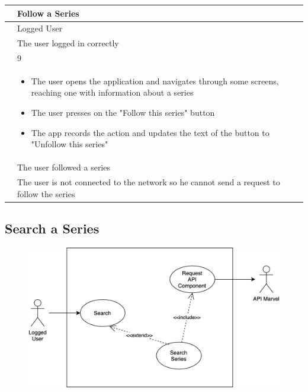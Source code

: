 {{{{{{{\renewcommand{\arraystretch}{2}
{\begin{center}
\begin{tabular}{ | m{4cm} | m{9cm} | } 
 \hline
 {\centering{\textbf{Name}}} & Follow a Series \\
 \hline
 {\centering{\textbf{Actor}}} & Logged User \\
 \hline
 {\centering{\textbf{Entry Condition}}} & The user logged in correctly \\
 \hline
 {\centering{\textbf{Goal}}} & 9 \\
 \hline
 {\centering{\textbf{Event flow}}} & \begin{itemize}[leftmargin=*]
 	\item The user opens the application and navigates through some screens, reaching one with information about a series
	\item The user presses on the "Follow this series" button 
	\item The app records the action and updates the text of the button to "Unfollow this series"
	\end{itemize} \\	
 \hline
 {\centering{\textbf{Exit condition}}} & The user followed a series \\
 \hline
 {\centering{\textbf{Exceptions}}} & The user is not connected to the network so he cannot send a request to follow the series \\
 \hline
\end{tabular}
\end{center}}


\clearpage

\subsection{Search a Series}
\begin{figure}[h]
\centering
\includegraphics[width=\textwidth]{img/usecases/search}
\end{figure}

}}}}}}}
